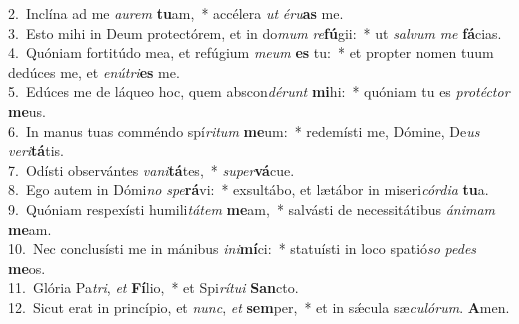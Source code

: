 {2.~}Inclína ad me \textit{au}\textit{rem} \textbf{tu}am,~* accélera \textit{ut} \textit{é}\textit{ru}\textbf{as} me.\\
{3.~}Esto mihi in Deum protectórem, et in do\textit{mum} \textit{re}\textbf{fú}gii:~* ut \textit{sal}\textit{vum} \textit{me} \textbf{fá}cias.\\
{4.~}Quóniam fortitúdo mea, et refúgium \textit{me}\textit{um} \textbf{es} tu:~* et propter nomen tuum dedúces me, et \textit{e}\textit{nú}\textit{tri}\textbf{es} me.\\
{5.~}Edúces me de láqueo hoc, quem abscon\textit{dé}\textit{runt} \textbf{mi}hi:~* quóniam tu es \textit{pro}\textit{té}\textit{ctor} \textbf{me}us.\\
{6.~}In manus tuas comméndo spí\textit{ri}\textit{tum} \textbf{me}um:~* redemísti me, Dómine, De\textit{us} \textit{ve}\textit{ri}\textbf{tá}tis.\\
{7.~}Odísti observántes \textit{va}\textit{ni}\textbf{tá}tes,~* \textit{su}\textit{per}\textbf{vá}cue.\\
{8.~}Ego autem in Dómi\textit{no} \textit{spe}\textbf{rá}vi:~* exsultábo, et lætábor in miseri\textit{cór}\textit{di}\textit{a} \textbf{tu}a.\\
{9.~}Quóniam respexísti humili\textit{tá}\textit{tem} \textbf{me}am,~* salvásti de necessitátibus \textit{á}\textit{ni}\textit{mam} \textbf{me}am.\\
{10.~}Nec conclusísti me in mánibus \textit{i}\textit{ni}\textbf{mí}ci:~* statuísti in loco spatió\textit{so} \textit{pe}\textit{des} \textbf{me}os.\\
{11.~}Glória Pa\textit{tri}, \textit{et} \textbf{Fí}lio,~* et Spi\textit{rí}\textit{tu}\textit{i} \textbf{San}cto.\\
{12.~}Sicut erat in princípio, et \textit{nunc}, \textit{et} \textbf{sem}per,~* et in sǽcula sæ\textit{cu}\textit{ló}\textit{rum}. \textbf{A}men.\\
